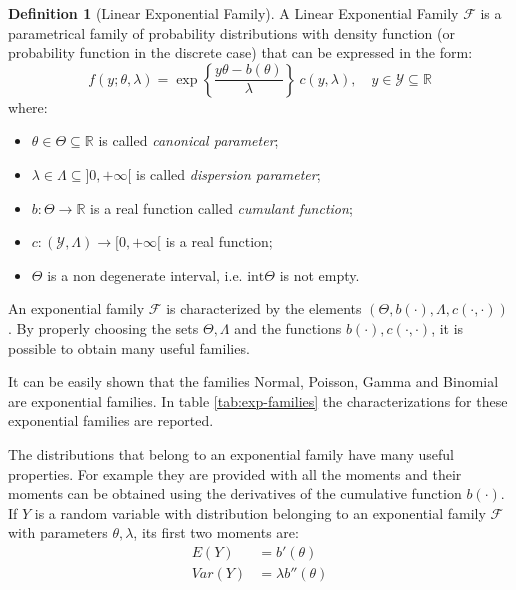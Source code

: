 \documentclass[a4paper, twoside, openright, 12pt]{report}
\theoremstyle{definition}
\newtheorem{definition}{Definition}[chapter]
\theoremstyle{definition}
\theoremstyle{definition}
\theoremstyle{remark}
\begin{document}
\begin{definition}[Linear Exponential Family]
\label{def:linear-exp-family} \iffalse (Linear Exponential Family) \fi{} A Linear Exponential Family \(\mathcal{F}\) is a parametrical family of probability distributions with density function (or probability function in the discrete case) that can be expressed in the form:
\[
f(y; \theta, \lambda) = \exp{\left\{ \frac{y\theta-b(\theta)}{\lambda} \right\}} \ c(y,\lambda), \quad y\in \mathcal{Y}\subseteq\mathbb{R}
\]
where:

\begin{itemize}
\item $\theta\in\Theta\subseteq\mathbb{R}$ is called \textit{canonical parameter};
\item $\lambda\in\Lambda\subseteq]0, +\infty[$ is called \textit{dispersion parameter};
\item $b: \Theta \rightarrow \mathbb{R}$ is a real function called \textit{cumulant function};
\item $c: (\mathcal{Y}, \Lambda) \rightarrow [0, +\infty[$ is a real function;
\item $\Theta$ is a non degenerate interval, i.e. $\text{int}\Theta$ is not empty.
\end{itemize}
\end{definition}

An exponential family \(\mathcal{F}\) is characterized by the elements \(\left( \Theta, b(\cdot), \Lambda, c(\cdot, \cdot) \right)\). By properly choosing the sets \(\Theta, \Lambda\) and the functions \(b(\cdot), c(\cdot, \cdot)\), it is possible to obtain many useful families.

It can be easily shown that the families Normal, Poisson, Gamma and Binomial are exponential families. In table \ref{tab:exp-families} the characterizations for these exponential families are reported.

The distributions that belong to an exponential family have many useful properties. For example they are provided with all the moments and their moments can be obtained using the derivatives of the cumulative function \(b(\cdot)\). If \(Y\) is a random variable with distribution belonging to an exponential family \(\mathcal{F}\) with parameters \(\theta, \lambda\), its first two moments are:
\begin{align}
\label{eq:exp-fam-expected-value}
E(Y)   & = b'(\theta) \\
Var(Y) & = \lambda b''(\theta)
\end{align}
\end{document}
